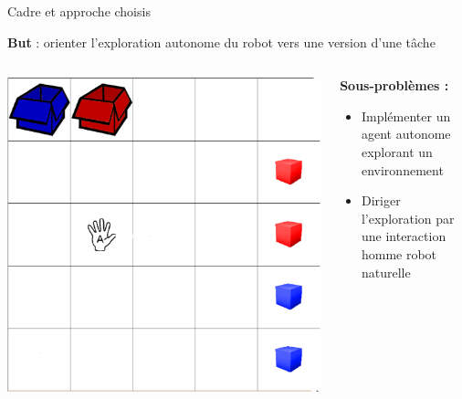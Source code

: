 \documentclass[xcolor=pst,dvips,12pt,english,french]{beamer}
\begin{document}
	\begin{frame}{Cadre et approche choisis}
		\begin{block}{}
			\textbf{But} : orienter l'exploration autonome du robot vers une version d'une tâche 
		\end{block}
		\begin{columns}
			\begin{column}{0.4\textwidth}
				\includegraphics[width=\textwidth]{images/playroom1.eps}
			\end{column}
			\begin{column}{0.45\textwidth}
				\begin{block}{}
					\textbf{Sous-problèmes :}
					\begin{itemize}
						\item Implémenter un agent autonome explorant un environnement 
						\item Diriger l'exploration par une interaction homme robot naturelle
					\end{itemize}
				\end{block}
			\end{column}
		\end{columns}
	\end{frame}
	
\end{document}

